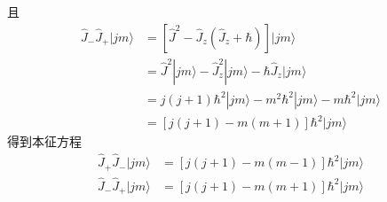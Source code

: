 且
\begin{equation}
    \begin{aligned}
        \hat{J}_-\hat{J}_+|jm\rangle &=[\hat{J}^2-\hat{J}_z(\hat{J}_z+\hbar )]|jm\rangle 
\\
&=\hat{J}^2|jm\rangle -\hat{J}_{z}^{2}|jm\rangle -\hbar \hat{J}_z|jm\rangle 
\\
&=j\left( j+1 \right) \hbar ^2|jm\rangle -m^2\hbar ^2|jm\rangle -m\hbar ^2|jm\rangle 
\\
&=\left[ j\left( j+1 \right) -m\left( m+1 \right) \right] \hbar ^2|jm\rangle 
    \end{aligned}
\end{equation}
得到本征方程
\begin{equation}
    \begin{aligned}
        \hat{J}_+\hat{J}_-|jm\rangle &=\left[ j\left( j+1 \right) -m\left( m-1 \right) \right] \hbar ^2|jm\rangle 
\\
\hat{J}_-\hat{J}_+|jm\rangle &=\left[ j\left( j+1 \right) -m\left( m+1 \right) \right] \hbar ^2|jm\rangle 
    \end{aligned}
\end{equation}

